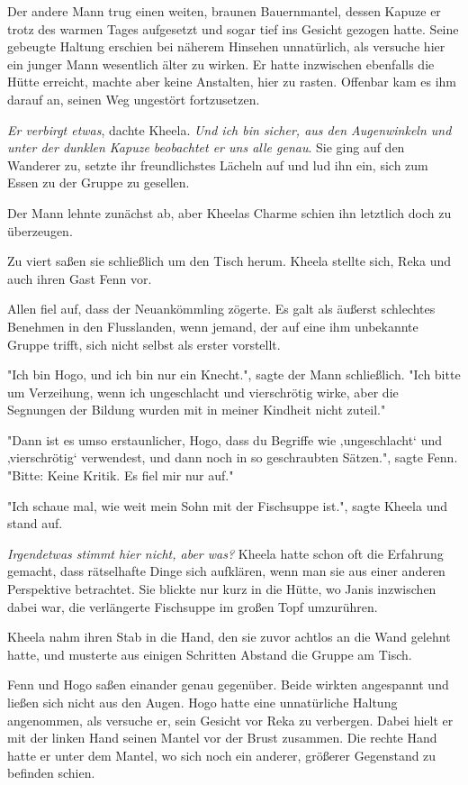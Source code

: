 \documentclass[10pt, a4paper, oneside]{book}
\begin{document}
\begin{multicols}{2}
Der andere Mann trug einen weiten, braunen Bauernmantel, dessen Kapuze er trotz des warmen Tages aufgesetzt und sogar tief ins Gesicht gezogen hatte. Seine gebeugte Haltung erschien bei näherem Hinsehen unnatürlich, als versuche hier ein junger Mann wesentlich älter zu wirken. Er hatte inzwischen ebenfalls die Hütte erreicht, machte aber keine Anstalten, hier zu rasten. Offenbar kam es ihm darauf an, seinen Weg ungestört fortzusetzen. 

\textit{Er verbirgt etwas}, dachte Kheela. \textit{Und ich bin sicher, aus den Augenwinkeln und unter der dunklen Kapuze beobachtet er uns alle genau}. Sie ging auf den Wanderer zu, setzte ihr freundlichstes Lächeln auf und lud ihn ein, sich zum Essen zu der Gruppe zu gesellen. 

Der Mann lehnte zunächst ab, aber Kheelas Charme schien ihn letztlich doch zu überzeugen. 

Zu viert saßen sie schließlich um den Tisch herum. Kheela stellte sich, Reka und auch ihren Gast Fenn vor. 

Allen fiel auf, dass der Neuankömmling zögerte. Es galt als äußerst schlechtes Benehmen in den Flusslanden, wenn jemand, der auf eine ihm unbekannte Gruppe trifft, sich nicht selbst als erster vorstellt. 

"Ich bin Hogo, und ich bin nur ein Knecht.", sagte der Mann schließlich. "Ich bitte um Verzeihung, wenn ich ungeschlacht und vierschrötig wirke, aber die Segnungen der Bildung wurden mit in meiner Kindheit nicht zuteil." 

"Dann ist es umso erstaunlicher, Hogo, dass du Begriffe wie ‚ungeschlacht‘ und ‚vierschrötig‘ verwendest, und dann noch in so geschraubten Sätzen.", sagte Fenn. "Bitte: Keine Kritik. Es fiel mir nur auf." 

"Ich schaue mal, wie weit mein Sohn mit der Fischsuppe ist.", sagte Kheela und stand auf. 

\textit{Irgendetwas stimmt hier nicht, aber was?} Kheela hatte schon oft die Erfahrung gemacht, dass rätselhafte Dinge sich aufklären, wenn man sie aus einer anderen Perspektive betrachtet. Sie blickte nur kurz in die Hütte, wo Janis inzwischen dabei war, die verlängerte Fischsuppe im großen Topf umzurühren. 

Kheela nahm ihren Stab in die Hand, den sie zuvor achtlos an die Wand gelehnt hatte, und musterte aus einigen Schritten Abstand die Gruppe am Tisch. 

Fenn und Hogo saßen einander genau gegenüber. Beide wirkten angespannt und ließen sich nicht aus den Augen. Hogo hatte eine unnatürliche Haltung angenommen, als versuche er, sein Gesicht vor Reka zu verbergen. Dabei hielt er mit der linken Hand seinen Mantel vor der Brust zusammen. Die rechte Hand hatte er unter dem Mantel, wo sich noch ein anderer, größerer Gegenstand zu befinden schien. 


\end{multicols}
\end{document}
